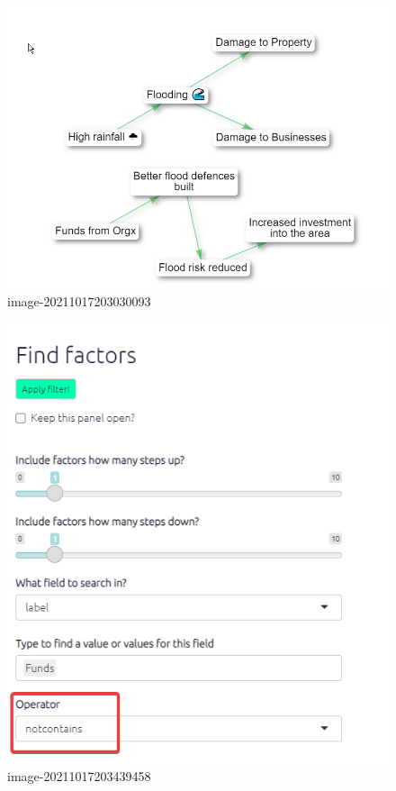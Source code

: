 \documentclass[
]{book}
\begin{document}
\begin{figure}
\centering
\includegraphics{_assets/image-20211017203030093.png}
\caption{image-20211017203030093}
\end{figure}

\begin{figure}
\centering
\includegraphics{_assets/image-20211017203439458.png}
\caption{image-20211017203439458}
\end{figure}
\end{document}
